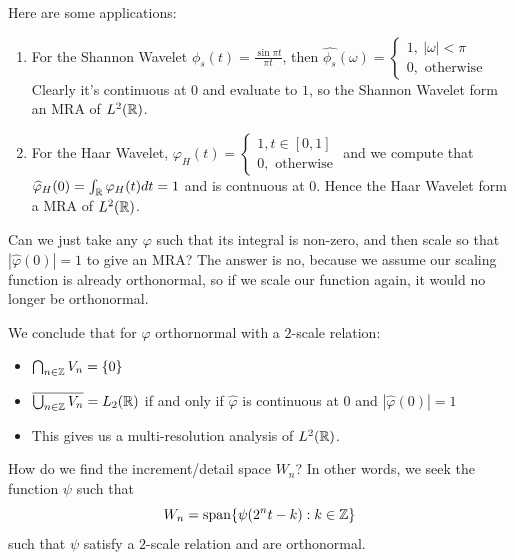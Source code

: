 \documentclass{article}
\begin{document}
{\begin{example}
    Here are some applications:
    \begin{enumerate}
        \item For the Shannon Wavelet $\phi_s(t) = \frac{\sin \pi t}{\pi t}$, then $\widehat{\phi_s}(\omega) = \begin{cases}
            1,\ |\omega| < \pi\\
            0, \text{ otherwise}
        \end{cases}$
        Clearly it's continuous at $0$ and evaluate to $1$, so the Shannon Wavelet form an MRA of $L^2(\mathbb{R})$.
        \item For the Haar Wavelet, $\varphi_{H}(t) = \begin{cases}
            1, t \in [0, 1]\\
            0, \text{ otherwise}
        \end{cases}$ and we compute that $\widehat{\varphi}_H(0) = \int_{\mathbb{R}} \varphi_H(t) dt = 1$ and is contnuous at $0$. Hence the Haar Wavelet form a MRA of $L^2(\mathbb{R})$.
    \end{enumerate}
\end{example}

\begin{question}
    Can we just take any $\varphi$ such that its integral is non-zero, and then scale so that $|\widehat{\varphi}(0)| = 1$ to give an MRA? The answer is no, because we assume our scaling function is already orthonormal, so if we scale our function again, it would no longer be orthonormal. 
\end{question}

We conclude that for $\varphi$ orthornormal with a $2$-scale relation:
\begin{itemize}
    \item $\bigcap_{n \in \mathbb{Z}} V_n = \{0\}$
    \item $\overline{\bigcup_{n \in \mathbb{Z}} V_n } = L_2(\mathbb{R})$ if and only if $\widehat{\varphi}$ is continuous at $0$ and $|\widehat{\varphi}(0)| = 1$
    \item This gives us a multi-resolution analysis of $L^2(\mathbb{R})$.
\end{itemize}

\begin{question}
    How do we find the increment/detail space $W_n$? In other words, we seek the function $\psi$ such that
    \[W_n = \operatorname{span} \{\psi(2^n t - k): k \in \mathbb{Z}\}\]
    such that $\psi$ satisfy a $2$-scale relation and are orthonormal.
\end{question}

}
\end{document}
